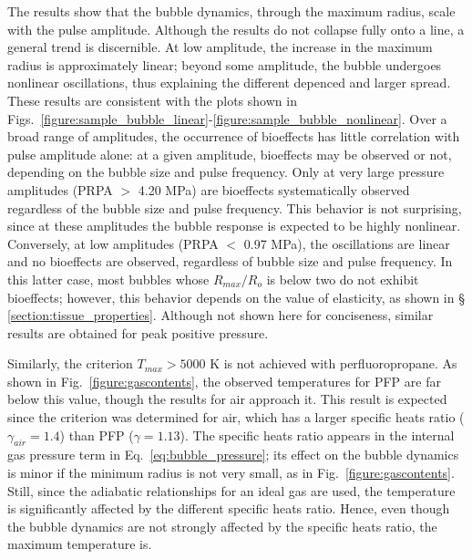The results show that the bubble dynamics, through the maximum radius,
scale with the pulse amplitude. Although the results do not collapse fully
onto a line, a general trend is discernible. At low amplitude, the increase in
the maximum radius is approximately linear; beyond some amplitude, the bubble undergoes
nonlinear oscillations, thus explaining the different depenced and larger spread. 
These results are consistent with the plots shown in 
Figs.~\ref{figure:sample_bubble_linear}-\ref{figure:sample_bubble_nonlinear}.
Over a broad range of amplitudes, the
occurrence of bioeffects has little correlation with pulse amplitude
alone: at a given amplitude, bioeffects may be observed or not,
depending on the bubble size and pulse frequency.  Only at very large
pressure amplitudes (PRPA $>$ 4.20 MPa) are bioeffects systematically observed regardless of the
bubble size and pulse frequency. This behavior is not surprising, since at
these amplitudes the bubble response is expected to be highly
nonlinear. Conversely, at low amplitudes (PRPA $<$ 0.97 MPa), the oscillations are 
linear and no bioeffects are observed, regardless of
bubble size and pulse frequency. In this latter case, most bubbles
whose $R_{max}/R_o$ is below two do not exhibit bioeffects; however,
this behavior depends on the value of elasticity, as shown in \S
\ref{section:tissue_properties}.  Although not shown here for conciseness,
similar results are obtained for peak positive pressure.


Similarly, the criterion $T_{max} > 5000$ K is not achieved with perfluoropropane.
As shown in Fig.~\ref{figure:gascontents}, the observed temperatures for
PFP are far below this value, though the results for air approach it. This
result is expected since the criterion was determined for air, which
has a larger specific heats ratio ($\gamma_{air}=1.4$) than
PFP ($\gamma= 1.13$). The specific heats ratio appears in
the internal gas pressure term in Eq.~\ref{eq:bubble_pressure}; its
effect on the bubble dynamics is minor if the minimum radius is not
very small, as in Fig.~\ref{figure:gascontents}. Still, since the
adiabatic relationships for an ideal gas are used, the temperature is
significantly affected by the different specific heats ratio. Hence,
even though the bubble dynamics are not strongly affected by the
specific heats ratio, the maximum temperature is.

